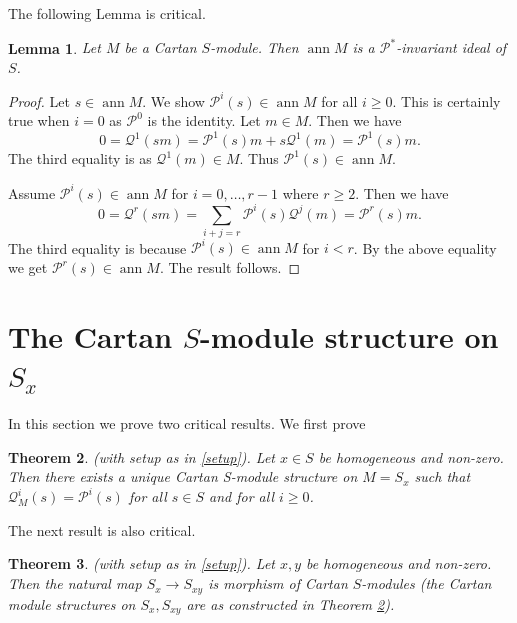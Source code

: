 \documentclass{amsart}
\newcommand{\Pc}{\mathcal{P} }
\newcommand{\Qc}{\mathcal{Q} }
\newcommand{\rt}{\rightarrow}
\newcommand{\ann}{\operatorname{ann}}
\theoremstyle{plain}
\newtheorem{theorem}{Theorem}[section]
\newtheorem{lemma}[theorem]{Lemma}
\theoremstyle{definition}
\theoremstyle{remark}
\begin{document}
The following Lemma is critical.
\begin{lemma}\label{ann-p*}
Let $M$ be a Cartan $S$-module. Then $\ann M$ is a $\Pc^*$-invariant ideal of $S$.
\end{lemma}
\begin{proof}
Let $s \in \ann M$. We show $\Pc^i(s) \in \ann M$ for all $i \geq 0$. This is certainly true when $i = 0$ as $\Pc^0$ is the identity. Let $m \in M$.
Then we have
$$ 0 = \Qc^1(s m) = \Pc^1(s) m + s \Qc^1(m) = \Pc^1(s)m.$$
The third equality is as $\Qc^1(m) \in M$. Thus $\Pc^1(s) \in \ann M$.

Assume $\Pc^i(s) \in \ann M $ for $i = 0, \ldots, r-1$ where $r \geq 2$. Then we have
$$0 = \Qc^r(sm) = \sum_{i+j = r}\Pc^i(s)\Qc^j(m) = \Pc^r(s)m. $$
The third equality is because $\Pc^i(s) \in \ann M$ for $i< r$. By the above equality we get $\Pc^r(s) \in \ann M$.
The result follows.
\end{proof}
\section{The Cartan $S$-module structure on $S_x$}
In this section we prove two critical results. We first prove
\begin{theorem}
\label{loc}(with setup as in \ref{setup}). Let $x \in S$ be homogeneous and non-zero. Then there exists a  unique Cartan S-module structure on $M = S_x$ such that $\Qc^i_M(s) = \Pc^i(s)$ for all $s \in S$ and for all $i \geq 0$.
\end{theorem}
The next result is also critical.
\begin{theorem}
\label{maps}(with setup as in \ref{setup}). Let $x, y$ be homogeneous and non-zero. Then the natural map $S_x \rt S_{xy}$ is morphism of Cartan $S$-modules (the Cartan module structures on $S_x, S_{xy}$ are as constructed in Theorem \ref{loc}).
\end{theorem}
\end{document}
